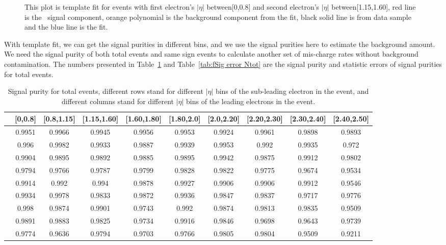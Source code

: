 \begin{figure}[htp]
\begin{minipage}[t]{0.5\linewidth}
  \caption{This plot is template fit for events with first electron's $|\eta|$ between[0,0.8] and second electron's $|\eta|$ between[1.15,1.60], red line is the \Zee\ signal component, orange polynomial is the background component from the fit, black solid line is from data sample and the blue line is the fit.}
  \label{fig:Template fit}
  \end{minipage}
\end{figure}  

With template fit, we can get the signal purities in different bins, and we use the signal purities here to estimate the background amount. We need the signal purity of both total events and same sign events to calculate another set of mis-charge rates without background contamination. The numbers presented in Table~\ref{tab:fSig Ntot} and Table~\ref{tab:fSig error Ntot} are the signal purity and statistic errors of signal purities for total events. 
\begin{table}
\footnotesize
\centering
\begin{tabular}{c|c|c|c|c|c|c|c|c|c}
  \hline
   &[0,0.8] &[0.8,1.15] &[1.15,1.60] &[1.60,1.80] &[1.80,2.0] &[2.0,2.20] &[2.20,2.30] &[2.30,2.40] &[2.40,2.50] \\
  \hline
  [0,0.8]  &0.9951 &0.9966 &0.9945 &0.9956 &0.9953 &0.9924 &0.9961 &0.9898 &0.9893 \\
  \hline
  [0.8,1.15]  &0.996 &0.9982 &0.9933 &0.9887 &0.9939 &0.9953 &0.992 &0.9935 &0.972 \\
  \hline
  [1.15,1.60]  &0.9904 &0.9895 &0.9892 &0.9885 &0.9895 &0.9942 &0.9875 &0.9912 &0.9802 \\
  \hline
  [1.60,1.80] &0.9794 &0.9766 &0.9787 &0.9799 &0.9828 &0.9822 &0.9775 &0.9674 &0.9534 \\
  \hline
  [1.80,2.0]  &0.9914 &0.992 &0.994 &0.9878 &0.9927 &0.9906 &0.9906 &0.9912 &0.9546 \\
  \hline
  [2.0,2.20] &0.9934 &0.9978 &0.9833 &0.9872 &0.9936 &0.9847 &0.9837 &0.9717 &0.9776 \\
  \hline
  [2.20,2.30] &0.998 &0.9874 &0.9901 &0.9743 &0.992 &0.9874 &0.9813 &0.9835 &0.9509 \\
  \hline
  [2.30,2.40] &0.9891 &0.9883 &0.9825 &0.9734 &0.9916 &0.9846 &0.9698 &0.9643 &0.9739 \\
  \hline
  [2.40,2.50] &0.9774 &0.9636 &0.9794 &0.9703 &0.9766 &0.9805 &0.9804 &0.9509 &0.9211 \\
  \hline
\end{tabular}
\caption{Signal purity for total events, different rows stand for different $|\eta|$ bins of the sub-leading electron in the event, and different columns stand for different $|\eta|$ bins of the leading electrons in the event.} 
\label{tab:fSig Ntot}
\end{table}
 
